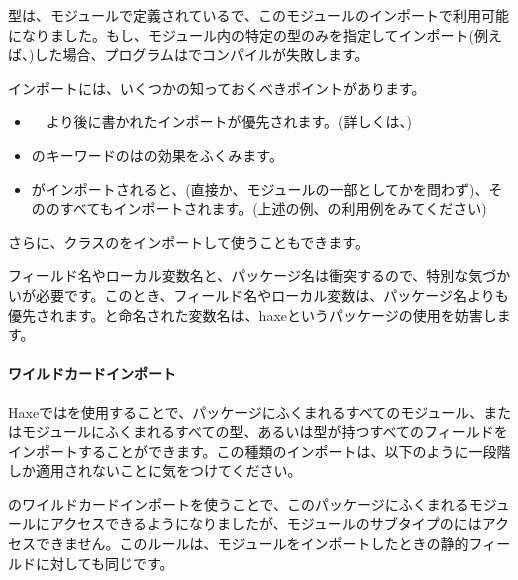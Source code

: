 
型は、モジュールで定義されているで、このモジュールのインポートで利用可能になりました。もし、モジュール内の特定の型のみを指定してインポート(例えば、)した場合、プログラムはでコンパイルが失敗します。

インポートには、いくつかの知っておくべきポイントがあります。

\begin{itemize}
	\item　より後に書かれたインポートが優先されます。(詳しくは、)
	\item {}のキーワードのはの効果をふくみます。
	\item {}がインポートされると、(直接か、モジュールの一部としてかを問わず)、そののすべてもインポートされます。(上述の例、の利用例をみてください)
\end{itemize}

さらに、クラスのをインポートして使うこともできます。


フィールド名やローカル変数名と、パッケージ名は衝突するので、特別な気づかいが必要です。このとき、フィールド名やローカル変数は、パッケージ名よりも優先されます。と命名された変数名は、haxeというパッケージの使用を妨害します。

\paragraph{ワイルドカードインポート}

Haxeではを使用することで、パッケージにふくまれるすべてのモジュール、またはモジュールにふくまれるすべての型、あるいは型が持つすべてのフィールドをインポートすることができます。この種類のインポートは、以下のように一段階しか適用されないことに気をつけてください。


のワイルドカードインポートを使うことで、このパッケージにふくまれるモジュールにアクセスできるようになりましたが、モジュールのサブタイプのにはアクセスできません。このルールは、モジュールをインポートしたときの静的フィールドに対しても同じです。

